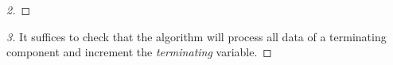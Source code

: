 \begin{claim}
\begin{proof}[2]
\end{proof}
\begin{proof}[3]
It suffices to check that the algorithm will process all data of a terminating component and increment the \emph{terminating} variable.
\end{proof}
\end{claim}




